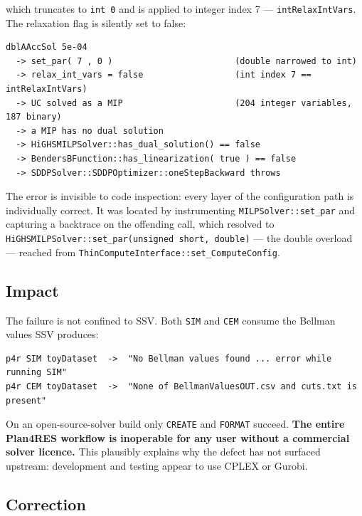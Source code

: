 \documentclass[12pt,a4paper]{article}
\begin{document}
which truncates to \texttt{int 0} and is applied to integer index 7 ---
\texttt{intRelaxIntVars}. The relaxation flag is silently set to false:

\begin{center}
\begin{minipage}{0.92\textwidth}
\begin{lstlisting}
dblAAccSol 5e-04
  -> set_par( 7 , 0 )                        (double narrowed to int)
  -> relax_int_vars = false                  (int index 7 == intRelaxIntVars)
  -> UC solved as a MIP                      (204 integer variables, 187 binary)
  -> a MIP has no dual solution
  -> HiGHSMILPSolver::has_dual_solution() == false
  -> BendersBFunction::has_linearization( true ) == false
  -> SDDPSolver::SDDPOptimizer::oneStepBackward throws
\end{lstlisting}
\end{minipage}
\end{center}

The error is invisible to code inspection: every layer of the configuration path
is individually correct. It was located by instrumenting
\texttt{MILPSolver::set\_par} and capturing a backtrace on the offending call,
which resolved to \texttt{HiGHSMILPSolver::set\_par(unsigned short, double)} ---
the double overload --- reached from
\texttt{ThinComputeInterface::set\_ComputeConfig}.

\subsection{Impact}

The failure is not confined to SSV. Both \texttt{SIM} and \texttt{CEM} consume
the Bellman values SSV produces:

\begin{lstlisting}
p4r SIM toyDataset  ->  "No Bellman values found ... error while running SIM"
p4r CEM toyDataset  ->  "None of BellmanValuesOUT.csv and cuts.txt is present"
\end{lstlisting}

On an open-source-solver build only \texttt{CREATE} and \texttt{FORMAT} succeed.
\textbf{The entire Plan4RES workflow is inoperable for any user without a
commercial solver licence.} This plausibly explains why the defect has not
surfaced upstream: development and testing appear to use CPLEX or Gurobi.

\subsection{Correction}
\end{document}
